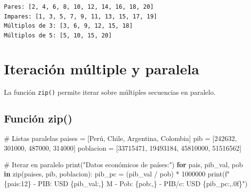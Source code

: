 \documentclass[
  doc,
  floatsintext,
  longtable,
  a4paper,
  nolmodern,
  notxfonts,
  notimes,
  12pt,
  colorlinks=true,linkcolor=blue,citecolor=blue,urlcolor=blue]{apa7}
\newenvironment{Shaded}{\begin{snugshade}}{\end{snugshade}}
\newcommand{\BuiltInTok}[1]{\textcolor[rgb]{0.00,0.23,0.31}{#1}}
\newcommand{\CommentTok}[1]{\textcolor[rgb]{0.37,0.37,0.37}{#1}}
\newcommand{\ControlFlowTok}[1]{\textcolor[rgb]{0.00,0.23,0.31}{\textbf{#1}}}
\newcommand{\DecValTok}[1]{\textcolor[rgb]{0.68,0.00,0.00}{#1}}
\newcommand{\KeywordTok}[1]{\textcolor[rgb]{0.00,0.23,0.31}{\textbf{#1}}}
\newcommand{\NormalTok}[1]{\textcolor[rgb]{0.00,0.23,0.31}{#1}}
\newcommand{\OperatorTok}[1]{\textcolor[rgb]{0.37,0.37,0.37}{#1}}
\newcommand{\SpecialCharTok}[1]{\textcolor[rgb]{0.37,0.37,0.37}{#1}}
\newcommand{\SpecialStringTok}[1]{\textcolor[rgb]{0.13,0.47,0.30}{#1}}
\newcommand{\StringTok}[1]{\textcolor[rgb]{0.13,0.47,0.30}{#1}}
\begin{document}
\begin{verbatim}
Pares: [2, 4, 6, 8, 10, 12, 14, 16, 18, 20]
Impares: [1, 3, 5, 7, 9, 11, 13, 15, 17, 19]
Múltiplos de 3: [3, 6, 9, 12, 15, 18]
Múltiplos de 5: [5, 10, 15, 20]
\end{verbatim}

\section{Iteración múltiple y
paralela}\label{iteraciuxf3n-muxfaltiple-y-paralela}

La función \texttt{zip()} permite iterar sobre múltiples secuencias en
paralelo.

\subsection{Función zip()}\label{funciuxf3n-zip}

\begin{Shaded}
\begin{Highlighting}[]
\CommentTok{\# Listas paralelas}
\NormalTok{paises }\OperatorTok{=}\NormalTok{ [}\StringTok{\textquotesingle{}Perú\textquotesingle{}}\NormalTok{, }\StringTok{\textquotesingle{}Chile\textquotesingle{}}\NormalTok{, }\StringTok{\textquotesingle{}Argentina\textquotesingle{}}\NormalTok{, }\StringTok{\textquotesingle{}Colombia\textquotesingle{}}\NormalTok{]}
\NormalTok{pib }\OperatorTok{=}\NormalTok{ [}\DecValTok{242632}\NormalTok{, }\DecValTok{301000}\NormalTok{, }\DecValTok{487000}\NormalTok{, }\DecValTok{314000}\NormalTok{]}
\NormalTok{poblacion }\OperatorTok{=}\NormalTok{ [}\DecValTok{33715471}\NormalTok{, }\DecValTok{19493184}\NormalTok{, }\DecValTok{45810000}\NormalTok{, }\DecValTok{51516562}\NormalTok{]}

\CommentTok{\# Iterar en paralelo}
\BuiltInTok{print}\NormalTok{(}\StringTok{"Datos económicos de países:"}\NormalTok{)}
\ControlFlowTok{for}\NormalTok{ pais, pib\_val, pob }\KeywordTok{in} \BuiltInTok{zip}\NormalTok{(paises, pib, poblacion):}
\NormalTok{    pib\_pc }\OperatorTok{=}\NormalTok{ (pib\_val }\OperatorTok{/}\NormalTok{ pob) }\OperatorTok{*} \DecValTok{1000000}
    \BuiltInTok{print}\NormalTok{(}\SpecialStringTok{f"}\SpecialCharTok{\{}\NormalTok{pais}\SpecialCharTok{:12\}}\SpecialStringTok{ {-} PIB: USD }\SpecialCharTok{\{}\NormalTok{pib\_val}\SpecialCharTok{:,\}}\SpecialStringTok{ M {-} Pob: }\SpecialCharTok{\{}\NormalTok{pob}\SpecialCharTok{:,\}}\SpecialStringTok{ {-} PIB/c: USD }\SpecialCharTok{\{}\NormalTok{pib\_pc}\SpecialCharTok{:,.0f\}}\SpecialStringTok{"}\NormalTok{)}
\end{Highlighting}
\end{Shaded}
\end{document}
